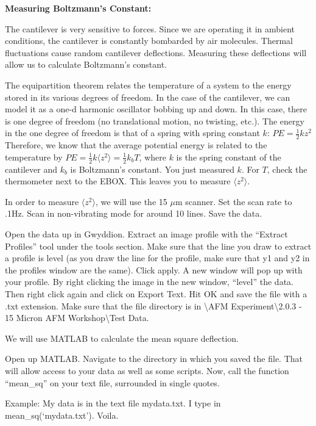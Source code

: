 \documentclass{../lab}
\begin{document}
\textbf{Measuring Boltzmann's Constant:}

The cantilever is very sensitive to forces. Since we are operating it in ambient conditions, the cantilever is constantly bombarded by air molecules. Thermal fluctuations cause random cantilever deflections. Measuring these deflections will allow us to calculate Boltzmann's constant.

The equipartition theorem relates the temperature of a system to the energy stored in its various degrees of freedom. In the case of the cantilever, we can model it as a one-d harmonic oscillator bobbing up and down. In this case, there is one degree of freedom (no translational motion, no twisting, etc.). The energy in the one degree of freedom is that of a spring with spring constant $k$: $PE = \frac{1}{2} k z^2$ Therefore, we know that the average potential energy is related to the temperature by $PE = \frac{1}{2} k \langle z^{2} \rangle = \frac{1}{2} k_b T$, where $k$ is the spring constant of the cantilever and $k_b$ is Boltzmann's constant. You just measured $k$. For $T$, check the thermometer next to the EBOX. This leaves you to measure $\langle z^2 \rangle$.

In order to measure $\langle z^2 \rangle$, we will use the 15 $\mu$m scanner. Set the scan rate to .1Hz. Scan in non-vibrating mode for around 10 lines. Save the data.

Open the data up in Gwyddion. Extract an image profile with the ``Extract Profiles'' tool under the tools section. Make sure that the line you draw to extract a profile is level (as you draw the line for the profile, make sure that y1 and y2 in the profiles window are the same). Click apply. A new window will pop up with your profile.  By right clicking the image in the new window, ``level'' the data. Then right click again and click on Export Text. Hit OK and save the file with a .txt extension. Make sure that the file directory is in \textbackslash AFM Experiment\textbackslash 2.0.3 - 15 Micron AFM Workshop\textbackslash Test Data.

We will use MATLAB to calculate the mean square deflection.

Open up MATLAB. Navigate to the directory in which you saved the file. That will allow access to your data as well as some scripts. Now, call the function ``mean\_sq'' on your text file, surrounded in single quotes.

Example: My data is in the text file mydata.txt. I type in mean\_sq(`mydata.txt'). Voila.
\end{document}
